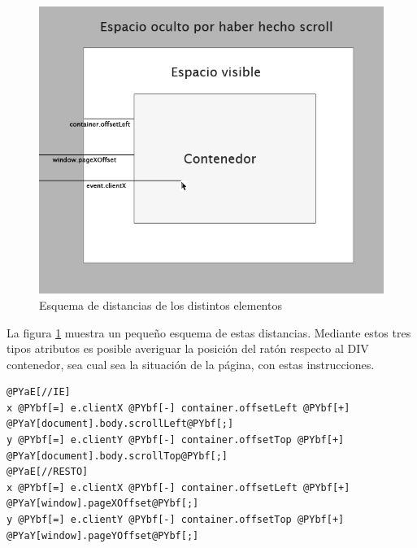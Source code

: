 \begin{figure}[h!]
\centering
\includegraphics[width=\textwidth]{mouse_pointer.png}
\caption{Esquema de distancias de los distintos elementos}\label{fig:mouse_pointer}
\end{figure}

La figura \ref{fig:mouse_pointer} muestra un pequeño esquema de estas distancias. Mediante estos tres tipos atributos es posible averiguar la posición del ratón respecto al DIV contenedor, sea cual sea la situación de la página, con estas instrucciones.

\begin{Verbatim}[commandchars=@\[\]]
@PYaE[//IE]
x @PYbf[=] e.clientX @PYbf[-] container.offsetLeft @PYbf[+] @PYaY[document].body.scrollLeft@PYbf[;]
y @PYbf[=] e.clientY @PYbf[-] container.offsetTop @PYbf[+] @PYaY[document].body.scrollTop@PYbf[;]
@PYaE[//RESTO]
x @PYbf[=] e.clientX @PYbf[-] container.offsetLeft @PYbf[+] @PYaY[window].pageXOffset@PYbf[;]
y @PYbf[=] e.clientY @PYbf[-] container.offsetTop @PYbf[+] @PYaY[window].pageYOffset@PYbf[;]
\end{Verbatim}


